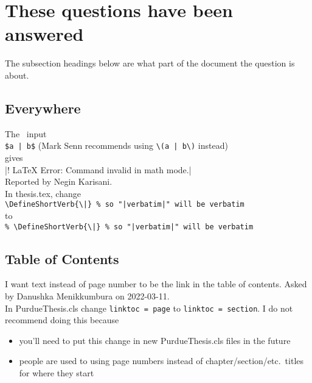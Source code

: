 \section{These questions have been answered}

The subsection headings below are what part of the document
the question is about.


\subsection*{Everywhere}
The \LaTeXLogo\ input\\
 \verb+$a | b$+\qquad
(Mark Senn recommends using \verb+\(a | b\)+ instead)\\
gives\\
 |! LaTeX Error: Command \ttfamily invalid in math mode.|\\
Reported by Negin Karisani.\\
\MyA
In thesis.tex, change\\
 \verb+\DefineShortVerb{\|} % so "|verbatim|" will be verbatim+\\
to\\
 \verb+% \DefineShortVerb{\|} % so "|verbatim|" will be verbatim+


\subsection*{Table of Contents}

I want text instead of page number to be the link
in the table of contents.
Asked by Danushka Menikkumbura on 2022-03-11.\\
\MyA
In PurdueThesis.cls change \verb+linktoc = page+
to \verb+linktoc = section+.
I do not recommend doing this because
\begin{itemize}
  \item
    you'll need to put this change
    in new PurdueThesis.cls files in the future
  \item
    people are used to using page numbers instead
    of chapter/section/etc.~titles for where they
    start
\end{itemize}



